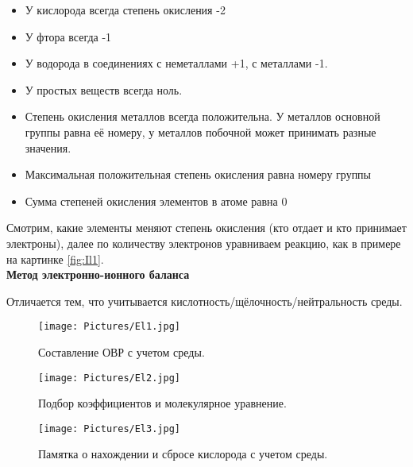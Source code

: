 \begin{itemize}
	\item У кислорода всегда степень окисления -2
	\item У фтора всегда -1
	\item У водорода в соединениях с неметаллами +1, с металлами -1.
	\item У простых веществ всегда ноль.
	\item Степень окисления металлов всегда положительна. У металлов основной группы равна её номеру, у металлов побочной может принимать разные значения.
	\item Максимальная положительная степень окисления равна номеру группы
	\item Сумма степеней окисления элементов в атоме равна 0\\

\end{itemize}
	
Смотрим, какие элементы меняют степень окисления (кто отдает и кто принимает электроны), далее по количеству электронов уравниваем реакцию, как в примере на картинке \ref{fig:Il1}.\\

\textbf{Метод электронно-ионного баланса}

Отличается тем, что учитывается кислотность/щёлочность/нейтральность среды.

\begin{figure}[H]
	\centering
	\texttt{[image: Pictures/El1.jpg]}
	\caption{Составление ОВР с учетом среды.}
\end{figure}
\begin{figure}[H]
	\centering
	\texttt{[image: Pictures/El2.jpg]}
	\caption{Подбор коэффициентов и молекулярное уравнение.}
\end{figure}
\begin{figure}[H]
	\centering
	\texttt{[image: Pictures/El3.jpg]}
	\caption{Памятка о нахождении и сбросе кислорода с учетом среды.}
\end{figure}

